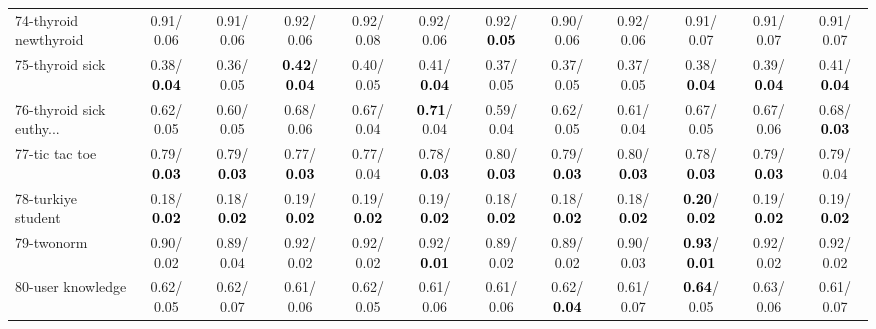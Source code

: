 \begin{table}[h]
\begin{center}
{\begin{tabular}{lc|c|c|c|c|c|c|c|c|c|c}
74-thyroid newthyroid &   0.91/  0.06 &   0.91/  0.06 &   0.92/  0.06 &   0.92/  0.08 &   0.92/  0.06 &   0.92/\textcolor{black}{\textbf{  0.05}} &   0.90/  0.06 &   0.92/  0.06 &   0.91/  0.07 &   0.91/  0.07 &   0.91/  0.07 \\
75-thyroid sick &   0.38/\textcolor{black}{\textbf{  0.04}} &   0.36/  0.05 & \textcolor{black}{\textbf{  0.42}}/\textcolor{black}{\textbf{  0.04}} &   0.40/  0.05 &   0.41/\textcolor{black}{\textbf{  0.04}} &   0.37/  0.05 &   0.37/  0.05 &   0.37/  0.05 &   0.38/\textcolor{black}{\textbf{  0.04}} &   0.39/\textcolor{black}{\textbf{  0.04}} &   0.41/\textcolor{black}{\textbf{  0.04}} \\
76-thyroid sick euthy... &   0.62/  0.05 &   0.60/  0.05 &   0.68/  0.06 &   0.67/  0.04 & \textcolor{black}{\textbf{  0.71}}/  0.04 &   0.59/  0.04 &   0.62/  0.05 &   0.61/  0.04 &   0.67/  0.05 &   0.67/  0.06 &   0.68/\textcolor{black}{\textbf{  0.03}} \\
77-tic tac toe &   0.79/\textcolor{black}{\textbf{  0.03}} &   0.79/\textcolor{black}{\textbf{  0.03}} &   0.77/\textcolor{black}{\textbf{  0.03}} &   0.77/  0.04 &   0.78/\textcolor{black}{\textbf{  0.03}} &   0.80/\textcolor{black}{\textbf{  0.03}} &   0.79/\textcolor{black}{\textbf{  0.03}} &   0.80/\textcolor{black}{\textbf{  0.03}} &   0.78/\textcolor{black}{\textbf{  0.03}} &   0.79/\textcolor{black}{\textbf{  0.03}} &   0.79/  0.04 \\
78-turkiye student &   0.18/\textcolor{black}{\textbf{  0.02}} &   0.18/\textcolor{black}{\textbf{  0.02}} &   0.19/\textcolor{black}{\textbf{  0.02}} &   0.19/\textcolor{black}{\textbf{  0.02}} &   0.19/\textcolor{black}{\textbf{  0.02}} &   0.18/\textcolor{black}{\textbf{  0.02}} &   0.18/\textcolor{black}{\textbf{  0.02}} &   0.18/\textcolor{black}{\textbf{  0.02}} & \textcolor{black}{\textbf{  0.20}}/\textcolor{black}{\textbf{  0.02}} &   0.19/\textcolor{black}{\textbf{  0.02}} &   0.19/\textcolor{black}{\textbf{  0.02}} \\ \hline
79-twonorm &   0.90/  0.02 &   0.89/  0.04 &   0.92/  0.02 &   0.92/  0.02 &   0.92/\textcolor{black}{\textbf{  0.01}} &   0.89/  0.02 &   0.89/  0.02 &   0.90/  0.03 & \textcolor{black}{\textbf{  0.93}}/\textcolor{black}{\textbf{  0.01}} &   0.92/  0.02 &   0.92/  0.02 \\
80-user knowledge &   0.62/  0.05 &   0.62/  0.07 &   0.61/  0.06 &   0.62/  0.05 &   0.61/  0.06 &   0.61/  0.06 &   0.62/\textcolor{black}{\textbf{  0.04}} &   0.61/  0.07 & \textcolor{black}{\textbf{  0.64}}/  0.05 &   0.63/  0.06 &   0.61/  0.07 \\

\end{tabular}}
\end{center}
\end{table}
